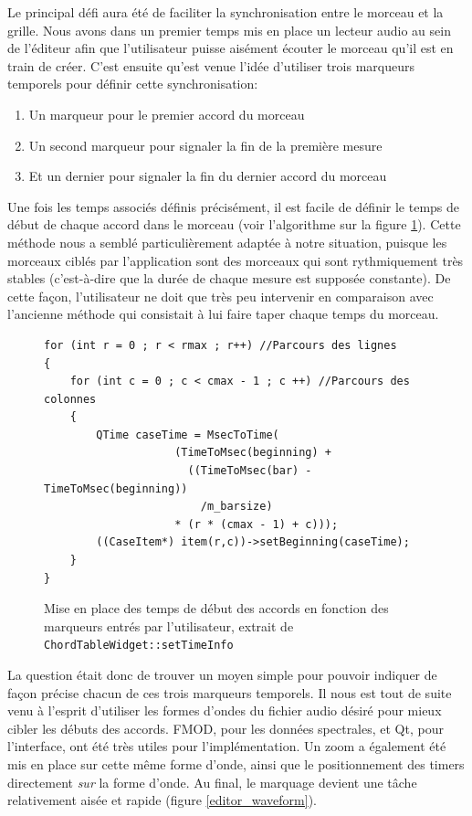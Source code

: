 \documentclass[a4paper,11pt]{article}
\begin{document}
Le principal défi aura été de faciliter la synchronisation entre le morceau et la grille. Nous avons dans un premier temps mis en place un lecteur audio au sein de l'éditeur afin que l'utilisateur puisse aisément écouter le morceau qu'il est en train de créer. C'est ensuite qu'est venue l'idée d'utiliser trois marqueurs temporels pour définir cette synchronisation:
\begin{enumerate}
 \item Un marqueur pour le premier accord du morceau
 \item Un second marqueur pour signaler la fin de la première mesure
 \item Et un dernier pour signaler la fin du dernier accord du morceau
\end{enumerate}
Une fois les temps associés définis précisément, il est facile de définir le temps de début de chaque accord dans le morceau (voir l'algorithme sur la figure \ref{editor_time_caseitems}). Cette méthode nous a semblé particulièrement adaptée à notre situation, puisque les morceaux ciblés par l'application sont des morceaux qui sont rythmiquement très stables (c'est-à-dire que la durée de chaque mesure est supposée constante). De cette façon, l'utilisateur ne doit que très peu intervenir en comparaison avec l'ancienne méthode qui consistait à lui faire taper chaque temps du morceau.

\begin{figure}[H]
\begin{lstlisting}
for (int r = 0 ; r < rmax ; r++) //Parcours des lignes
{
	for (int c = 0 ; c < cmax - 1 ; c ++) //Parcours des colonnes
	{
		QTime caseTime = MsecToTime(
				    (TimeToMsec(beginning) +
				      ((TimeToMsec(bar) - TimeToMsec(beginning))
				        /m_barsize)
				    * (r * (cmax - 1) + c)));
		((CaseItem*) item(r,c))->setBeginning(caseTime);
	}
}
\end{lstlisting}
\caption{Mise en place des temps de début des accords en fonction des marqueurs entrés par l'utilisateur, extrait de \texttt{ChordTableWidget::setTimeInfo}}
\label{editor_time_caseitems}
\end{figure}

La question était donc de trouver un moyen simple pour pouvoir indiquer de façon précise chacun de ces trois marqueurs temporels. Il nous est tout de suite venu à l'esprit d'utiliser les formes d'ondes du fichier audio désiré pour mieux cibler les débuts des accords. FMOD, pour les données spectrales, et Qt, pour l'interface, ont été très utiles pour l'implémentation. Un zoom a également été mis en place sur cette même forme d'onde, ainsi que le positionnement des timers directement \textit{sur} la forme d'onde. Au final, le marquage devient une tâche relativement aisée et rapide (figure \ref{editor_waveform}).
\end{document}
